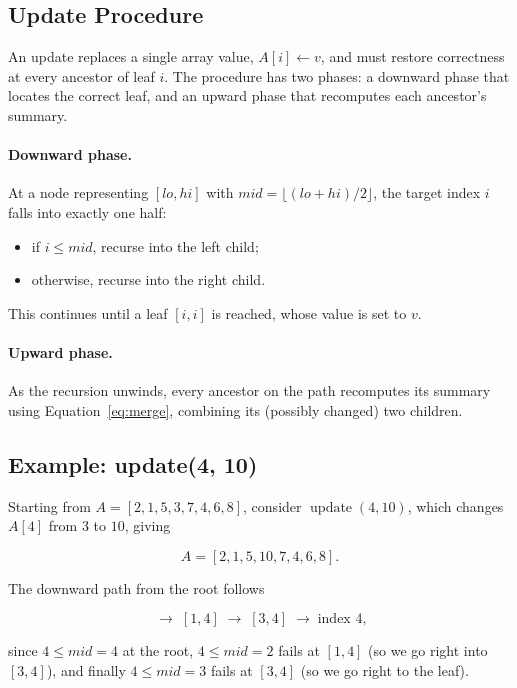\documentclass[11pt,open=any]{scrreprt}
\begin{document}
\subsection{Update Procedure}
An update replaces a single array value, $A[i] \leftarrow v$, and must restore correctness at every ancestor of leaf $i$. The procedure has two phases: a downward phase that locates the correct leaf, and an upward phase that recomputes each ancestor's summary.

\paragraph{Downward phase.} At a node representing $[lo, hi]$ with $mid = \lfloor (lo+hi)/2 \rfloor$, the target index $i$ falls into exactly one half:
\begin{itemize}[nosep]
  \item if $i \le mid$, recurse into the left child;
  \item otherwise, recurse into the right child.
\end{itemize}
This continues until a leaf $[i,i]$ is reached, whose value is set to $v$.

\paragraph{Upward phase.} As the recursion unwinds, every ancestor on the path recomputes its summary using Equation~\eqref{eq:merge}, combining its (possibly changed) two children.

\subsection{Example: update(4, 10)}
Starting from $A = [2,1,5,3,7,4,6,8]$, consider $\operatorname{update}(4,10)$, which changes $A[4]$ from $3$ to $10$, giving

\begin{equation}
A = [2,1,5,10,7,4,6,8].
\end{equation}

The downward path from the root follows

\begin{equation}
[1,8] \;\rightarrow\; [1,4] \;\rightarrow\; [3,4] \;\rightarrow\; \text{index } 4,
\end{equation}

since $4 \le mid = 4$ at the root, $4 \le mid = 2$ fails at $[1,4]$ (so we go right into $[3,4]$), and finally $4 \le mid = 3$ fails at $[3,4]$ (so we go right to the leaf).
\end{document}
